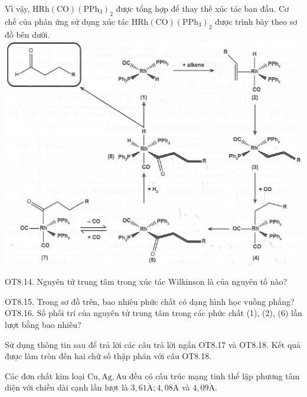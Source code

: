 \documentclass[10pt]{article}
\def\AA{\mathring{\mathrm{A}}}
\begin{document}
Vì vậy, $\mathrm{HRh}(\mathrm{CO})\left(\mathrm{PPh}_{3}\right)_{2}$ được tổng hợp để thay thế xúc tác ban đầu. Cơ chế của phản ứng sử dụng xúc tác $\mathrm{HRh}(\mathrm{CO})\left(\mathrm{PPh}_{3}\right)_{2}$ được trình bày theo sơ đồ bên dưới.\\
\includegraphics[max width=\textwidth, center]{2025_10_23_de6f5713836e4e91b3c8g-134}

OT8.14. Nguyên tử trung tâm trong xúc tác Wilkinson là của nguyên tố nào?

OT8.15. Trong sơ đồ trên, bao nhiêu phức chất có dạng hình học vuồng phẳng?\\
OT8.16. Số phối trí của nguyên tử trung tâm trong các phức chất (1), (2), (6) lần lượt bằng bao nhiêu?

Sử dụng thông tin sau để trả lời các câu trả lời ngắn OT8.17 và OT8.18. Kết quả được làm tròn đến hai chữ số thập phân với câu OT8.18.

Các đơn chất kim loại $\mathrm{Cu}, \mathrm{Ag}, \mathrm{Au}$ đều có cấu trúc mạng tinh thể lập phương tâm diện với chiều dài cạnh lần lượt là $3,61 \AA ; 4,08 \AA$ và $4,09 \AA$.
\end{document}
